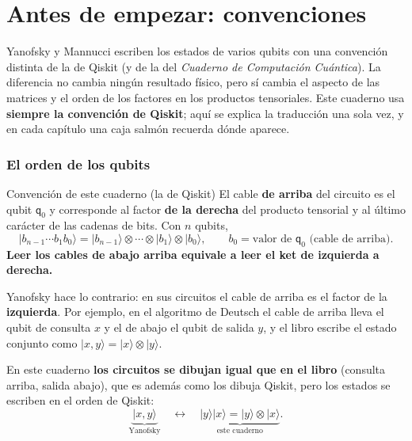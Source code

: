 \documentclass[11pt, a4paper, twoside, openright]{report}
\providecommand{\ket}[1]{|#1\rangle}
\begin{document}
\chapter*{Antes de empezar: convenciones}

\noindent Yanofsky y Mannucci escriben los estados de varios qubits con una convención distinta de la de Qiskit (y de la del \textit{Cuaderno de Computación Cuántica}). La diferencia no cambia ningún resultado físico, pero sí cambia el aspecto de las matrices y el orden de los factores en los productos tensoriales. Este cuaderno usa \textbf{siempre la convención de Qiskit}; aquí se explica la traducción una sola vez, y en cada capítulo una caja salmón recuerda dónde aparece.

\subsection*{El orden de los qubits}

\begin{teoria}{Convención de este cuaderno (la de Qiskit)}
El cable \textbf{de arriba} del circuito es el qubit $\mathsf{q}_0$ y corresponde al factor \textbf{de la derecha} del producto tensorial y al último carácter de las cadenas de bits. Con $n$ qubits,
\[ \ket{b_{n-1}\cdots b_1 b_0} = \ket{b_{n-1}}\otimes\cdots\otimes\ket{b_1}\otimes\ket{b_0}, \qquad b_0 = \text{valor de } \mathsf{q}_0 \text{ (cable de arriba)}. \]
\textbf{Leer los cables de abajo arriba equivale a leer el ket de izquierda a derecha.}
\end{teoria}

\noindent Yanofsky hace lo contrario: en sus circuitos el cable de arriba es el factor de la \textbf{izquierda}. Por ejemplo, en el algoritmo de Deutsch el cable de arriba lleva el qubit de consulta $x$ y el de abajo el qubit de salida $y$, y el libro escribe el estado conjunto como $\ket{x,y} = \ket{x}\otimes\ket{y}$.

\noindent En este cuaderno \textbf{los circuitos se dibujan igual que en el libro} (consulta arriba, salida abajo), que es además como los dibuja Qiskit, pero los estados se escriben en el orden de Qiskit:
\[ \underbrace{\ket{x,y}}_{\text{Yanofsky}} \quad\longleftrightarrow\quad \underbrace{\ket{y}\ket{x} = \ket{y}\otimes\ket{x}}_{\text{este cuaderno}}. \]
\end{document}
